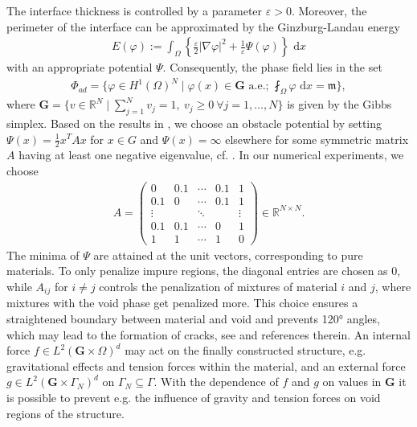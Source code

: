 \documentclass[a4paper,11pt]{article}
\theoremstyle{remark}
\newcommand{\dx}{\text{ d}x}
\newcommand{\R}{\mathbb{R}}
\newcommand{\HON}{H^1(\Omega)^N }
\newcommand{\G}{\mathbf{G}}
\def\fint#1{\strokedint#1}
\begin{document}
The interface thickness is controlled by a parameter $\varepsilon>0$.
Moreover, the perimeter of the interface can be approximated by the Ginzburg-Landau energy 
\begin{align}
\label{Ginz}
	E(\varphi):=\int_\Omega\left\{ \frac{\varepsilon}{2}|\nabla \varphi|^2 + \frac{1}{\varepsilon}\Psi(\varphi)\right\}\dx
\end{align}
with an appropriate potential $\Psi$.
Consequently, the phase field lies in the set
\begin{align}
\label{eq:PhiAD}
  \Phi_{ad} = \Big\{ \varphi\in \HON \mid \varphi(x) \in \mathbf{G} \text{ a.e.; }
  \fint_{\Omega} \varphi \dx = \mathfrak{m} \Big\},
\end{align}
where $\mathbf{G} = \{ v\in\mathbb{R}^N \mid \sum_{j=1}^N v_j = 1,\ v_j\geq 0  \ \forall j=1,\ldots , N \}$ is given by the Gibbs simplex.
%
Based on the results in \cite{BFGRS14}, we choose an obstacle potential by setting $\Psi(x) =\tfrac12 x^T Ax$ for $x\in G$ and $\Psi(x) =\infty$ elsewhere for some symmetric matrix $A$ having at least one negative eigenvalue, cf. \cite{BFGS14,EL91}.
In our numerical experiments, we choose
\begin{align}\label{eq:multipot2}
	A = \begin{pmatrix}0 & 0.1 & \cdots & 0.1 & 1 \\ 0.1 & 0 & \cdots & 0.1 & 1\\ \vdots & & \ddots & & \vdots \\ 0.1 & 0.1 & \cdots & 0 & 1\\ 1 & 1 & \cdots & 1 & 0\end{pmatrix}\in \R^{N\times N}.
\end{align}
The minima of $\Psi$ are attained at the unit vectors, corresponding to pure materials. To only penalize impure regions, the diagonal entries are chosen as $0$, while $A_{ij}$ for $i\neq j$ controls the penalization of mixtures of material $i$ and $j$, where mixtures with the void phase get penalized more. This choice ensures a straightened boundary between material and void and prevents 120° angles, which may lead to the formation of cracks, see \cite{BFGS14} and references therein.%
An internal force $f\in L^2(\G\times\Omega)^d$ may act on the finally constructed structure, e.g. gravitational effects and tension forces within the material, and an external force $g\in L^2(\G\times\Gamma_N)^d$ on $\Gamma_N\subseteq \Gamma$.
With the dependence of $f$ and $g$ on values in $\G $ it is possible to prevent e.g. the influence of gravity and tension forces on void regions of the structure.
\end{document}
